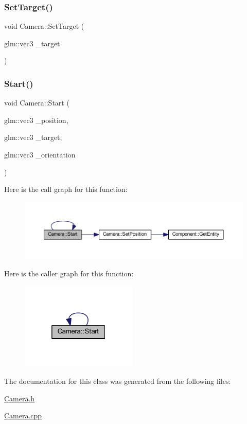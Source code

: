 \subsubsection{\texorpdfstring{Set\+Target()}{SetTarget()}}
{\footnotesize\ttfamily void Camera\+::\+Set\+Target (\begin{DoxyParamCaption}\item[{glm\+::vec3}]{\+\_\+target }\end{DoxyParamCaption})\hspace{0.3cm}{\ttfamily [inline]}}

\mbox{\label{class_camera_aaaf81f5649f2f9e003a922d4abd29c99}} 
\subsubsection{\texorpdfstring{Start()}{Start()}}
{\footnotesize\ttfamily void Camera\+::\+Start (\begin{DoxyParamCaption}\item[{glm\+::vec3}]{\+\_\+position,  }\item[{glm\+::vec3}]{\+\_\+target,  }\item[{glm\+::vec3}]{\+\_\+orientation }\end{DoxyParamCaption})}

Here is the call graph for this function\+:
\nopagebreak
\begin{figure}[H]
\begin{center}
\leavevmode
\includegraphics[width=350pt]{class_camera_aaaf81f5649f2f9e003a922d4abd29c99_cgraph}
\end{center}
\end{figure}
Here is the caller graph for this function\+:
\nopagebreak
\begin{figure}[H]
\begin{center}
\leavevmode
\includegraphics[width=157pt]{class_camera_aaaf81f5649f2f9e003a922d4abd29c99_icgraph}
\end{center}
\end{figure}


The documentation for this class was generated from the following files\+:\begin{DoxyCompactItemize}
\item 
\mbox{\hyperlink{_camera_8h}{Camera.\+h}}\item 
\mbox{\hyperlink{_camera_8cpp}{Camera.\+cpp}}\end{DoxyCompactItemize}
